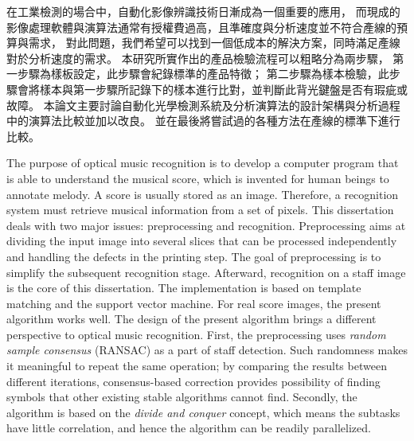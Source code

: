 \begin{abstractzh}
在工業檢測的場合中，自動化影像辨識技術日漸成為一個重要的應用，
而現成的影像處理軟體與演算法通常有授權費過高，且準確度與分析速度並不符合產線的預算與需求，
對此問題，我們希望可以找到一個低成本的解決方案，同時滿足產線對於分析速度的需求。
本研究所實作出的產品檢驗流程可以粗略分為兩步驟，
第一步驟為樣板設定，此步驟會紀錄標準的產品特徵；
第二步驟為樣本檢驗，此步驟會將樣本與第一步驟所記錄下的樣本進行比對，並判斷此背光鍵盤是否有瑕疵或故障。
本論文主要討論自動化光學檢測系統及分析演算法的設計架構與分析過程中的演算法比較並加以改良。
並在最後將嘗試過的各種方法在產線的標準下進行比較。
\end{abstractzh}

\begin{abstracten}
The purpose of optical music recognition is to develop a computer program that is able to understand the musical score, which is invented for human beings to annotate melody. A score is usually stored as an image. Therefore, a recognition system must retrieve musical information from a set of pixels.
This dissertation deals with two major issues: preprocessing and recognition. Preprocessing aims at dividing the input image into several slices that can be processed independently and handling the defects in the printing step. The goal of preprocessing is to simplify the subsequent recognition stage. Afterward, recognition on a staff image is the core of this dissertation. The implementation is based on template matching and the support vector machine. For real score images, the present algorithm works well.
The design of the present algorithm brings a different perspective to optical music recognition. First, the preprocessing uses \emph{random sample consensus} (RANSAC) as a part of staff detection. Such randomness makes it meaningful to repeat the same operation; by comparing the results between different iterations, consensus-based correction provides possibility of finding symbols that other existing stable algorithms cannot find. Secondly, the algorithm is based on the \emph{divide and conquer} concept, which means the subtasks have little correlation, and hence the algorithm can be readily parallelized.
\end{abstracten}


\begin{comment}
\category{I2.10}{Computing Methodologies}{Artificial Intelligence --
Vision and Scene Understanding} \category{H5.3}{Information
Systems}{Information Interfaces and Presentation (HCI) -- Web-based
Interaction.}

\terms{Design, Human factors, Performance.}

\keywords{Region of interest, Visual attention model, Web-based
games, Benchmarks.}
\end{comment}
